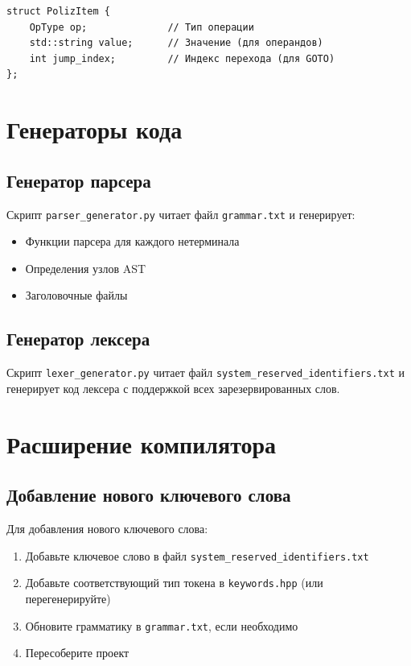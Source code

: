 \documentclass[12pt,a4paper]{article}
\begin{document}
\begin{lstlisting}
struct PolizItem {
    OpType op;              // Тип операции
    std::string value;      // Значение (для операндов)
    int jump_index;         // Индекс перехода (для GOTO)
};
\end{lstlisting}

\section{Генераторы кода}

\subsection{Генератор парсера}

Скрипт \texttt{parser\_generator.py} читает файл \texttt{grammar.txt} и генерирует:
\begin{itemize}
    \item Функции парсера для каждого нетерминала
    \item Определения узлов AST
    \item Заголовочные файлы
\end{itemize}

\subsection{Генератор лексера}

Скрипт \texttt{lexer\_generator.py} читает файл \texttt{system\_reserved\_identifiers.txt} и генерирует код лексера с поддержкой всех зарезервированных слов.

\section{Расширение компилятора}

\subsection{Добавление нового ключевого слова}

Для добавления нового ключевого слова:

\begin{enumerate}
    \item Добавьте ключевое слово в файл \texttt{system\_reserved\_identifiers.txt}
    \item Добавьте соответствующий тип токена в \texttt{keywords.hpp} (или перегенерируйте)
    \item Обновите грамматику в \texttt{grammar.txt}, если необходимо
    \item Пересоберите проект
\end{enumerate}
\end{document}
